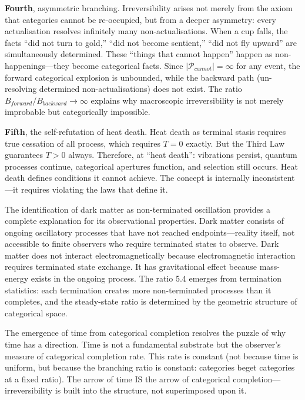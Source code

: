 \documentclass[12pt,a4paper]{article}
\theoremstyle{definition}
\theoremstyle{remark}
\begin{document}
\textbf{Fourth}, asymmetric branching. Irreversibility arises not merely from the axiom that categories cannot be re-occupied, but from a deeper asymmetry: every actualisation resolves infinitely many non-actualisations. When a cup falls, the facts ``did not turn to gold,'' ``did not become sentient,'' ``did not fly upward'' are simultaneously determined. These ``things that cannot happen'' happen as non-happenings---they become categorical facts. Since $|\mathcal{P}_{cannot}| = \infty$ for any event, the forward categorical explosion is unbounded, while the backward path (un-resolving determined non-actualisations) does not exist. The ratio $B_{forward}/B_{backward} \to \infty$ explains why macroscopic irreversibility is not merely improbable but categorically impossible.

\textbf{Fifth}, the self-refutation of heat death. Heat death as terminal stasis requires true cessation of all process, which requires $T = 0$ exactly. But the Third Law guarantees $T > 0$ always. Therefore, at ``heat death'': vibrations persist, quantum processes continue, categorical apertures function, and selection still occurs. Heat death defines conditions it cannot achieve. The concept is internally inconsistent---it requires violating the laws that define it.

The identification of dark matter as non-terminated oscillation provides a complete explanation for its observational properties. Dark matter consists of ongoing oscillatory processes that have not reached endpoints---reality itself, not accessible to finite observers who require terminated states to observe. Dark matter does not interact electromagnetically because electromagnetic interaction requires terminated state exchange. It has gravitational effect because mass-energy exists in the ongoing process. The ratio 5.4 emerges from termination statistics: each termination creates more non-terminated processes than it completes, and the steady-state ratio is determined by the geometric structure of categorical space.

The emergence of time from categorical completion resolves the puzzle of why time has a direction. Time is not a fundamental substrate but the observer's measure of categorical completion rate. This rate is constant (not because time is uniform, but because the branching ratio is constant: categories beget categories at a fixed ratio). The arrow of time IS the arrow of categorical completion---irreversibility is built into the structure, not superimposed upon it.
\end{document}

